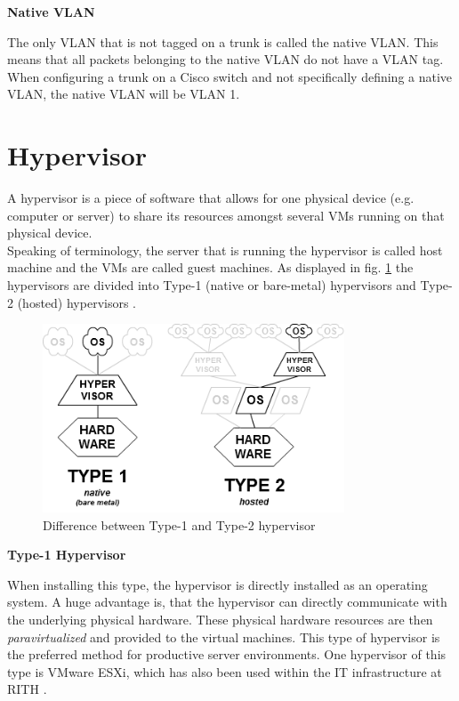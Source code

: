 \newpage
\textbf{Native VLAN}

The only VLAN that is not tagged on a trunk is called the native VLAN. This means that all packets belonging to the native VLAN do not have a VLAN tag. When configuring a trunk on a Cisco switch and not specifically defining a native VLAN, the native VLAN will be VLAN 1.

\section{Hypervisor}

A hypervisor is a piece of software that allows for one physical device (e.g. computer or server) to share its resources amongst several \acp{VM} running on that physical device. \\
Speaking of terminology, the server that is running the hypervisor is called host machine and the VMs are called guest machines. As displayed in fig. \ref{img:type_1_type_2_hypervisor} the hypervisors are divided into Type-1 (native or bare-metal) hypervisors and Type-2 (hosted) hypervisors \cite{bill:hypervisor}.

\begin{figure}[ht!]
	\centering
	\includegraphics[width=0.8\textwidth]{BilderAllgemein/hypervisor.png}
	\caption{Difference between Type-1 and Type-2 hypervisor \cite{wiki:hypervisor}}
	\label{img:type_1_type_2_hypervisor}
\end{figure}

\textbf{Type-1 Hypervisor}

When installing this type, the hypervisor is directly installed as an operating system. A huge advantage is, that the hypervisor can directly communicate with the underlying physical hardware. These physical hardware resources are then \textit{paravirtualized} and provided to the virtual machines. This type of hypervisor is the preferred method for productive server environments. One hypervisor of this type is VMware ESXi, which has also been used within the IT infrastructure at RITH \cite{bill:hypervisor}.

